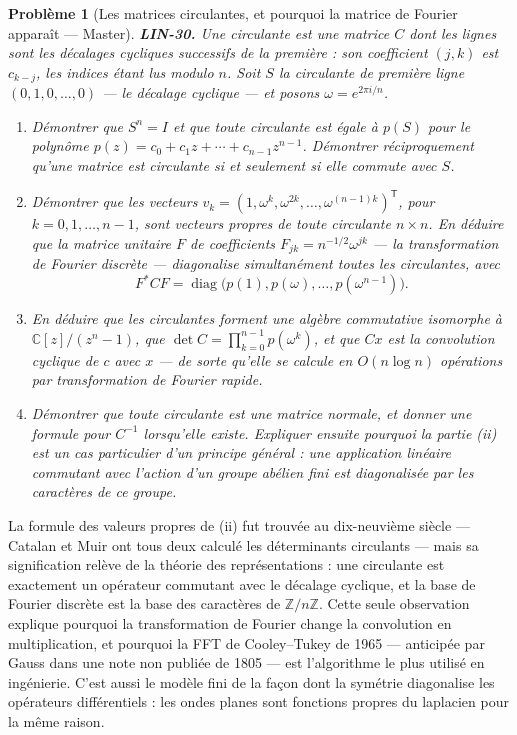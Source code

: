 \documentclass[11pt]{article}
\newtheorem{problem}{Problème}
\begin{document}
\begin{problem}[{Les matrices circulantes, et pourquoi la matrice de Fourier apparaît --- Master}]
\textbf{LIN-30.} Une \textit{circulante} est une matrice $C$ dont les lignes sont les décalages
cycliques successifs de la première : son coefficient $(j,k)$ est $c_{k-j}$, les indices étant lus
modulo $n$. Soit $S$ la circulante de première ligne $(0, 1, 0, \dots, 0)$ --- le décalage
cyclique --- et posons $\omega = e^{2\pi i / n}$.
\begin{enumerate}
\item[(i)] Démontrer que $S^n = I$ et que toute circulante est égale à $p(S)$ pour le polynôme
$p(z) = c_0 + c_1 z + \cdots + c_{n-1} z^{n-1}$. Démontrer réciproquement qu'une matrice est
circulante si et seulement si elle commute avec $S$.
\item[(ii)] Démontrer que les vecteurs $v_k = (1, \omega^{k}, \omega^{2k}, \dots, \omega^{(n-1)k})^{\mathsf{T}}$,
pour $k = 0, 1, \dots, n-1$, sont vecteurs propres de \textit{toute} circulante $n \times n$. En
déduire que la matrice unitaire $F$ de coefficients $F_{jk} = n^{-1/2} \omega^{jk}$ --- la
transformation de Fourier discrète --- diagonalise simultanément toutes les circulantes, avec
\[ F^{*} C F = \operatorname{diag}\big(p(1), p(\omega), \dots, p(\omega^{n-1})\big). \]
\item[(iii)] En déduire que les circulantes forment une algèbre commutative isomorphe à
$\mathbb{C}[z] / (z^n - 1)$, que $\det C = \prod_{k=0}^{n-1} p(\omega^{k})$, et que $Cx$ est la
convolution cyclique de $c$ avec $x$ --- de sorte qu'elle se calcule en $O(n \log n)$ opérations
par transformation de Fourier rapide.
\item[(iv)] Démontrer que toute circulante est une matrice normale, et donner une formule pour $C^{-1}$
lorsqu'elle existe. Expliquer ensuite pourquoi la partie (ii) est un cas particulier d'un principe
général : une application linéaire commutant avec l'action d'un groupe abélien fini est diagonalisée
par les caractères de ce groupe.
\end{enumerate}

\end{problem}

\noindent La formule des valeurs propres de (ii) fut trouvée au dix-neuvième siècle --- Catalan
et Muir ont tous deux calculé les déterminants circulants --- mais sa signification relève de la théorie
des représentations : une circulante est exactement un opérateur commutant avec le décalage cyclique,
et la base de Fourier discrète est la base des caractères de $\mathbb{Z}/n\mathbb{Z}$. Cette seule
observation explique pourquoi la transformation de Fourier change la convolution en multiplication, et
pourquoi la FFT de Cooley--Tukey de 1965 --- anticipée par Gauss dans une note non publiée de 1805 --- est
l'algorithme le plus utilisé en ingénierie. C'est aussi le modèle fini de la façon dont la symétrie
diagonalise les opérateurs différentiels : les ondes planes sont fonctions propres du laplacien pour
la même raison.
\end{document}
